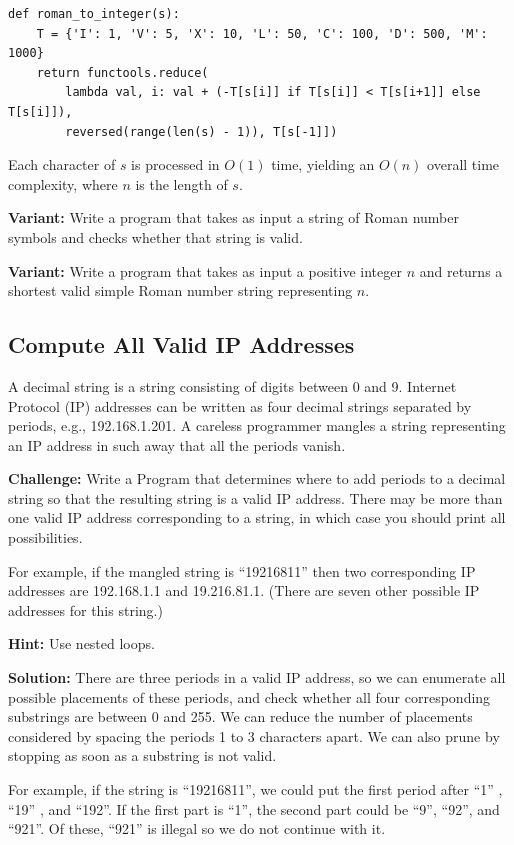 \documentclass[11pt,a4paper]{article}
\begin{document}
\begin{verbatim}
def roman_to_integer(s):
    T = {'I': 1, 'V': 5, 'X': 10, 'L': 50, 'C': 100, 'D': 500, 'M': 1000}
    return functools.reduce(
        lambda val, i: val + (-T[s[i]] if T[s[i]] < T[s[i+1]] else T[s[i]]), 
        reversed(range(len(s) - 1)), T[s[-1]])
\end{verbatim}  

Each character of $s$ is processed in $O(1)$ time, yielding an $O(n)$ overall
time complexity, where $n$ is the length of $s$.

\textbf{Variant:} Write a program that takes as input a string of Roman number
symbols and checks whether that string is valid.

\textbf{Variant:} Write a program that takes as input a positive integer $n$
and returns a shortest valid simple Roman number string representing $n$.

\subsection{Compute All Valid IP Addresses}

A decimal string is a string consisting of digits between 0 and 9. Internet
Protocol (IP) addresses can be written as four decimal strings separated by
periods, e.g., 192.168.1.201. A careless programmer mangles a string
representing an IP address in such away that all the periods vanish.

\textbf{Challenge:} Write a Program that determines where to add periods to a
decimal string so that the resulting string is a valid IP address. There may
be more than one valid IP address corresponding to a string, in which case you
should print all possibilities.

For example, if the mangled string is ``19216811'' then two corresponding IP
addresses are 192.168.1.1 and 19.216.81.1. (There are seven other possible IP
addresses for this string.)

\textbf{Hint:} Use nested loops.

\textbf{Solution:} There are three periods in a valid IP address, so we can
enumerate all possible placements of these periods, and check whether all four
corresponding substrings are between 0 and 255. We can reduce the number of
placements considered by spacing the periods 1 to 3 characters apart. We can
also prune by stopping as soon as a substring is not valid.

For example, if the string is ``19216811'', we could put the first period
after ``1'' , ``19'' , and ``192''. If the first part is ``1'', the second
part could be ``9'', ``92'', and ``921''. Of these, ``921'' is illegal so we
do not continue with it.
\end{document}
